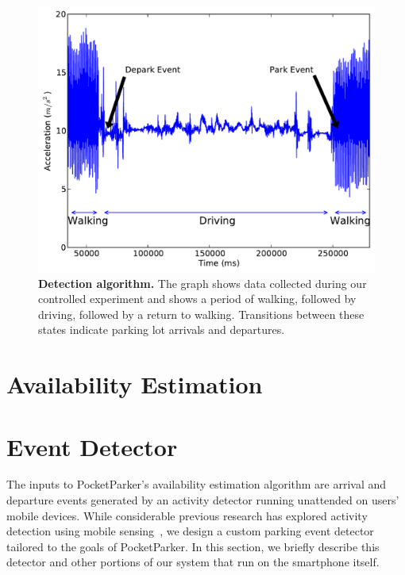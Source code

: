 \begin{figure}
  \centering
  \includegraphics[scale=.45]{./figures/Detection.pdf}

  \caption{\textbf{Detection algorithm.} The graph shows data collected
    during our controlled experiment and shows a period of walking, followed by
    driving, followed by a return to walking. Transitions between these states
  indicate parking lot arrivals and departures.}

  \label{fig-detection}
\end{figure}

\section{Availability Estimation}
\label{sec-model}



\section{Event Detector}
\label{sec-detector}

The inputs to PocketParker's availability estimation algorithm are arrival and
departure events generated by an activity detector running unattended on users'
mobile devices.  While considerable previous research has explored activity
detection using mobile sensing~\cite{Constandache:2010:DYS, Keally:2011:PTP,
Reddy:2010:UMP, Yang:2011:DDP, Wang:2009:FEE}, we design a custom parking event
detector tailored to the goals of PocketParker.  In this section, we briefly
describe this detector and other portions of our system that run on the
smartphone itself.  

